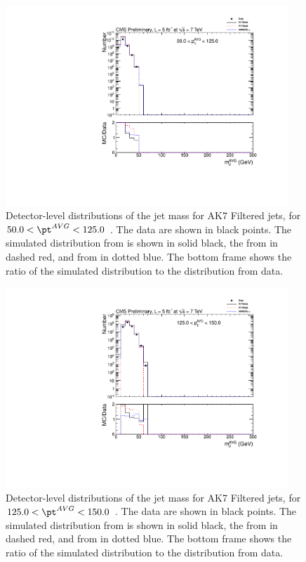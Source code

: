 \clearpage




\begin{figure}[htbp]
\centering
\includegraphics[width=0.95\textwidth]{figs/histAK7MjetVsPtAvg_rawDataMCComparisons_pt_1_Filtered}
\caption{Detector-level distributions of the jet mass for AK7 Filtered jets,
for $50.0 < \pt^{AVG} < 125.0$ \GeVc. The data are shown in black points.
The simulated distribution from \PYTHIA is shown in solid black, 
the from \PYTHIAEIGHT in dashed red, and from \HERWIG in dotted blue. 
The bottom frame shows the ratio of the simulated distribution
to the distribution from data. 
\label{figs:histAK7MjetVsPtAvg_rawDataMCComparisons_pt_1_Filtered}}
\end{figure}



\begin{figure}[htbp]
\centering
\includegraphics[width=0.95\textwidth]{figs/histAK7MjetVsPtAvg_rawDataMCComparisons_pt_2_Filtered}
\caption{Detector-level distributions of the jet mass for AK7 Filtered jets,
for $125.0 < \pt^{AVG} < 150.0$ \GeVc. The data are shown in black points.
The simulated distribution from \PYTHIA is shown in solid black, 
the from \PYTHIAEIGHT in dashed red, and from \HERWIG in dotted blue. 
The bottom frame shows the ratio of the simulated distribution
to the distribution from data. 
\label{figs:histAK7MjetVsPtAvg_rawDataMCComparisons_pt_2_Filtered}}
\end{figure}



